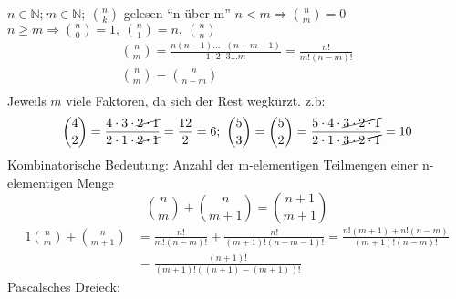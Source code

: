 $n \in \mathbb{N}; m \in \mathbb{N};\ \binom{n}{k}$  gelesen ``n über m'' $n < m \Rightarrow \binom{n}{m} = 0$ $n \geq m \Rightarrow \binom{n}{0} = 1,\ \binom{n}{1} = n,\ \binom{n}{n}$
\begin{gather*}
    \binom{n}{m} = \frac{n(n-1) \dots \cdot (n-m-1)}{1\cdot 2\cdot3 \dots m} = \frac{n!}{m!(n-m)!}\\
    \binom{n}{m}=\binom{n}{n-m}\\
\end{gather*} Jeweils $m$ viele Faktoren, da sich der Rest wegkürzt.
z.b:
\[\binom{4}{2} = \frac{4 \cdot 3 \cdot \cancel{2 \cdot 1}}{2 \cdot 1 \cdot \cancel{2 \cdot 1}} = \frac{12}{2} = 6;\ \binom{5}{3} = \binom{5}{2} = \frac{5 \cdot 4 \cdot  \cancel{3 \cdot 2 \cdot 1}}{2 \cdot 1 \cdot \cancel{3 \cdot 2 \cdot 1}} = 10\]
Kombinatorische Bedeutung: Anzahl der m-elementigen Teilmengen einer n-elementigen Menge
\[\binom{n}{m}+\binom{n}{m+1}=\binom{n+1}{m+1}\]
\begin{alignat*}{1}
    \binom{n}{m}+\binom{n}{m+1} & =\frac{n!}{m!(n-m)!}+\frac{n!}{(m+1)!(n-m-1)!}=\frac{n!(m+1)+n!(n-m)}{(m+1)!(n-m)!} \\
    & =\frac{(n+1)!}{(m+1)!((n+1)-(m+1))!}
\end{alignat*}
Pascalsches Dreieck: \\
